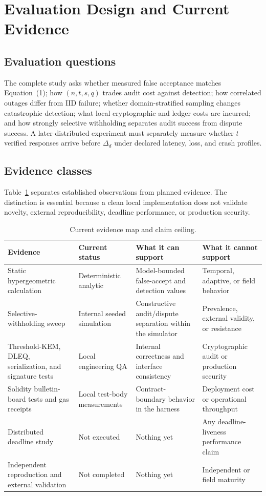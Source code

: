 \documentclass[10pt]{article}
\begin{document}
\section{Evaluation Design and Current Evidence}

\subsection{Evaluation questions}

The complete study asks whether measured false acceptance matches Equation~(1); how $(n,t,s,q)$ trades audit cost against detection; how correlated outages differ from IID failure; whether domain-stratified sampling changes catastrophic detection; what local cryptographic and ledger costs are incurred; and how strongly selective withholding separates audit success from dispute success. A later distributed experiment must separately measure whether $t$ verified responses arrive before $\Delta_d$ under declared latency, loss, and crash profiles.

\subsection{Evidence classes}

Table~\ref{tab:evidence} separates established observations from planned evidence. The distinction is essential because a clean local implementation does not validate novelty, external reproducibility, deadline performance, or production security.

\begin{table}[h]
\centering
\caption{Current evidence map and claim ceiling.}
\label{tab:evidence}
\small
\begin{tabularx}{\textwidth}{>{\raggedright\arraybackslash}p{} >{\raggedright\arraybackslash}p{} X >{\raggedright\arraybackslash}p{}}
\toprule
Evidence & Current status & What it can support & What it cannot support\\
\midrule
Static hypergeometric calculation & Deterministic analytic & Model-bounded false-accept and detection values & Temporal, adaptive, or field behavior\\
Selective-withholding sweep & Internal seeded simulation & Constructive audit/dispute separation within the simulator & Prevalence, external validity, or resistance\\
Threshold-KEM, DLEQ, serialization, and signature tests & Local engineering QA & Internal correctness and interface consistency & Cryptographic audit or production security\\
Solidity bulletin-board tests and gas receipts & Local test-body measurements & Contract-boundary behavior in the harness & Deployment cost or operational throughput\\
Distributed deadline study & Not executed & Nothing yet & Any deadline-liveness performance claim\\
Independent reproduction and external validation & Not completed & Nothing yet & Independent or field maturity\\
\bottomrule
\end{tabularx}
\end{table}
\end{document}
